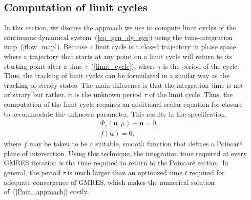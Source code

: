 \subsection{Computation of limit cycles}\label{rel_equ}
In this section, we discuss the approach we use to compute limit cycles of the continuous dynamical system~(\ref{eq_gen_dy_sys}) using the time-integration map~(\ref{flow_map}). Because a limit cycle is a closed trajectory in phase space where a trajectory that starts at any point on a limit cycle will return to its starting point after a time $\tau$~(\ref{limit_cycle}), where $\tau$ is the period of the cycle. Thus, the tracking of limit cycles can be formulated in a similar way as the tracking of steady states. The main difference is that the integration time is not arbitrary but rather, it is the unknown period $\tau$ of the limit cycle. Thus, the computation of the limit cycle requires an additional scalar equation for closure to accommodate the unknown parameter. This results in the specification,
\begin{align}
\label{Poin_approach}
&\Phi_{\tau}(\mathbf{u},\mu) - \mathbf{u} = 0,\\
&f(\mathbf{u}) = 0,
\end{align}
where $f$ may be taken to be a suitable, smooth function that defines a Poincar\'e plane of intersection. Using this technique, the integration time required at every GMRES iteration is the time required to return to the Poincar\'e section. In general, the period $\tau$ is much larger than an optimized time $t$ required for adequate convergence of  GMRES, which makes the numerical solution of~(\ref{Poin_approach}) costly.

